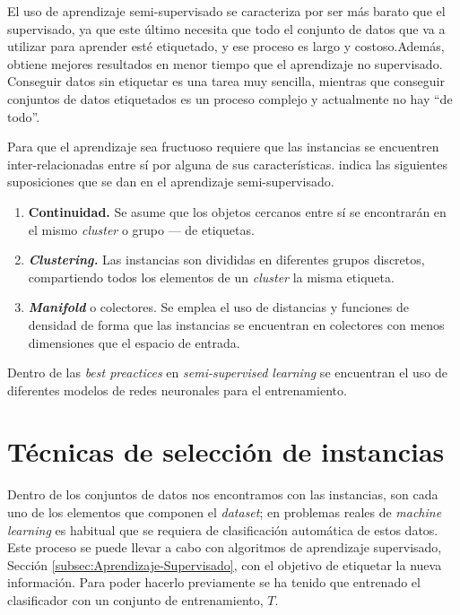 El uso de aprendizaje semi-supervisado se caracteriza por ser más barato que el supervisado, ya que este último necesita que todo el conjunto de datos que va a utilizar para aprender esté etiquetado, y ese proceso es largo y costoso.Además, obtiene mejores resultados en menor tiempo que el aprendizaje no supervisado. 
Conseguir datos sin etiquetar es una tarea muy sencilla, mientras que conseguir conjuntos de datos etiquetados es un proceso complejo y actualmente no hay ``de todo''.

Para que el aprendizaje sea fructuoso requiere que las instancias se encuentren inter-relacionadas entre sí por alguna de sus características. \cite{javatpoint_semisupervised} indica las siguientes suposiciones que se dan en el aprendizaje semi-supervisado.
\begin{enumerate}
	\item \textbf{Continuidad.} Se asume que los objetos cercanos entre sí se encontrarán en el mismo \textit{cluster} o grupo --- de etiquetas. 
	\item \textbf{\textit{Clustering.}} Las instancias son divididas en diferentes grupos discretos, compartiendo todos los elementos de un \textit{cluster} la misma etiqueta.
	\item \textbf{\textit{Manifold}} o colectores. Se emplea el uso de distancias y funciones de densidad de forma que las instancias se encuentran en colectores con menos dimensiones que el espacio de entrada.
\end{enumerate}

Dentro de las \textit{best preactices} en \textit{semi-supervised learning} se encuentran el uso de diferentes modelos de redes neuronales para el entrenamiento.  \cite{thekumparampil2018attention}
\newpage

\section{Técnicas de selección de instancias}\label{sec:tecnicas-seleccion-instancias}
Dentro de los conjuntos de datos nos encontramos con las instancias, son cada uno de los elementos que componen el \textit{dataset}; en problemas reales de \textit{machine learning} es habitual que se requiera de clasificación automática de estos datos. Este proceso se puede llevar a cabo con algoritmos de aprendizaje supervisado, Sección \ref{subsec:Aprendizaje-Supervisado}, con el objetivo de etiquetar la nueva información. Para poder hacerlo previamente se ha tenido que entrenado el clasificador con un conjunto de entrenamiento, $T$. \cite{olvera2010review}

